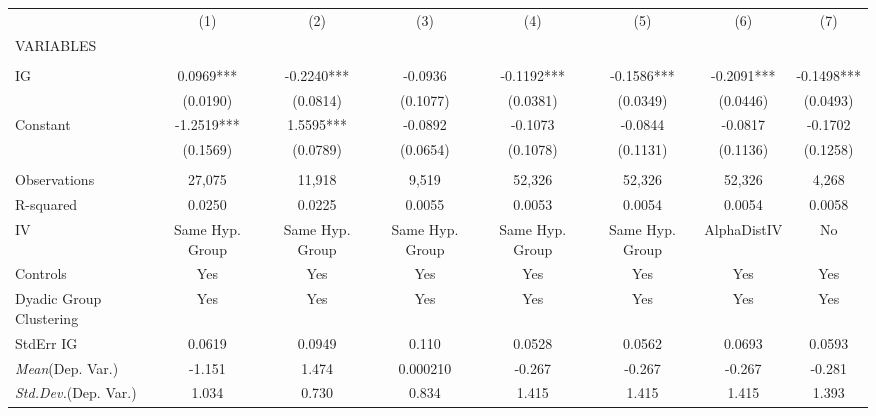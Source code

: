 \documentclass[]{article}
\begin{document}
\begin{tabular}{lccccccc} \hline
 & (1) & (2) & (3) & (4) & (5) & (6) & (7) \\
VARIABLES &  &  &  &  &  &  &  \\ \hline
 &  &  &  &  &  &  &  \\
IG & 0.0969*** & -0.2240*** & -0.0936 & -0.1192*** & -0.1586*** & -0.2091*** & -0.1498*** \\
 & (0.0190) & (0.0814) & (0.1077) & (0.0381) & (0.0349) & (0.0446) & (0.0493) \\
Constant & -1.2519*** & 1.5595*** & -0.0892 & -0.1073 & -0.0844 & -0.0817 & -0.1702 \\
 & (0.1569) & (0.0789) & (0.0654) & (0.1078) & (0.1131) & (0.1136) & (0.1258) \\
 &  &  &  &  &  &  &  \\
Observations & 27,075 & 11,918 & 9,519 & 52,326 & 52,326 & 52,326 & 4,268 \\
R-squared & 0.0250 & 0.0225 & 0.0055 & 0.0053 & 0.0054 & 0.0054 & 0.0058 \\
IV & Same Hyp. Group & Same Hyp. Group & Same Hyp. Group & Same Hyp. Group & Same Hyp. Group & AlphaDistIV & No \\
Controls & Yes & Yes & Yes & Yes & Yes & Yes & Yes \\
Dyadic Group Clustering & Yes & Yes & Yes & Yes & Yes & Yes & Yes \\
StdErr IG & 0.0619 & 0.0949 & 0.110 & 0.0528 & 0.0562 & 0.0693 & 0.0593 \\
\textit{Mean}(Dep. Var.) & -1.151 & 1.474 & 0.000210 & -0.267 & -0.267 & -0.267 & -0.281 \\
 \textit{Std.Dev.}(Dep. Var.) & 1.034 & 0.730 & 0.834 & 1.415 & 1.415 & 1.415 & 1.393 \\ \hline
\end{tabular}
\end{document}
